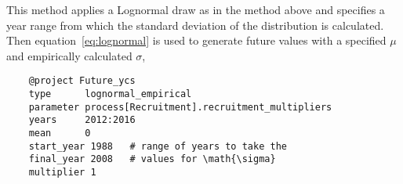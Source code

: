 This method applies a Lognormal draw as in the  method above and specifies a year range from which the standard deviation of the distribution is calculated. Then equation~\eqref{eq:lognormal} is used to generate future values with a specified $\mu$ and empirically calculated $\sigma$,

{\small{\begin{verbatim}
	@project Future_ycs
	type      lognormal_empirical
	parameter process[Recruitment].recruitment_multipliers
	years     2012:2016
	mean      0
	start_year 1988   # range of years to take the
	final_year 2008   # values for \math{\sigma}
	multiplier 1
\end{verbatim}}}






